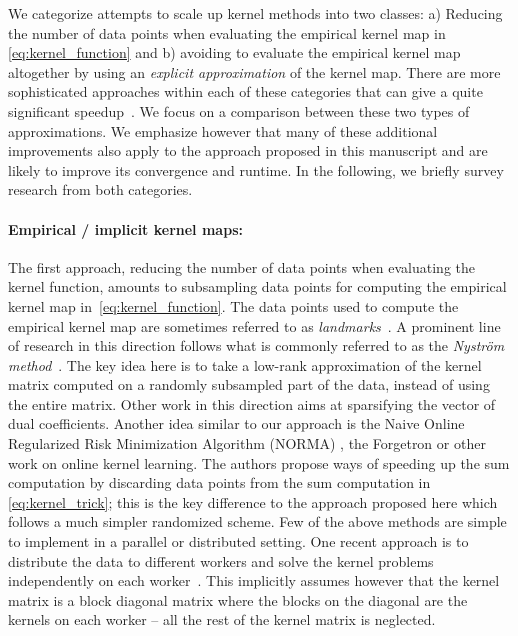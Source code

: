 \documentclass{article} %
\begin{document}
We categorize attempts to scale up kernel methods into two classes: a) Reducing the number of data points when evaluating the empirical kernel map in \autoref{eq:kernel_function} and b) avoiding to evaluate the empirical kernel map altogether by using an {\em explicit approximation} of the kernel map. There are more sophisticated approaches within each of these categories that can give a quite significant speedup~\cite{Le2013, Rudi2015}. We focus on a comparison between these two types of approximations. We emphasize however that many of these additional improvements also apply to the approach proposed in this manuscript and are likely to improve its convergence and runtime. In the following, we briefly survey research from both categories.

\paragraph{Empirical / implicit kernel maps:} The first approach, reducing the number of data points when evaluating the kernel function, amounts to subsampling data points for computing the empirical kernel map in~\autoref{eq:kernel_function}. 
The data points used to compute the empirical kernel map are sometimes referred to as {\em landmarks}~\cite{Hsieh2014}. 
A prominent line of research in this direction follows what is commonly referred to as the {\em Nystr\"om method}~\cite{Williams2000}. The key idea here is to take a low-rank approximation of the kernel matrix computed on a randomly subsampled part of the data, instead of using the entire matrix. 
Other work in this direction aims at sparsifying the vector of dual coefficients. Another idea similar to our approach is the Naive Online Regularized Risk Minimization Algorithm (NORMA) \cite{Kivinen2004}, the Forgetron \cite{Dekel2008} or other work on online kernel learning. The authors propose ways of speeding up the sum computation by discarding data points from the sum computation in \autoref{eq:kernel_trick}; this is the key difference to the approach proposed here which follows a much simpler randomized scheme.  
Few of the above methods are simple to implement in a parallel or distributed setting. One recent approach is to distribute the data to different workers and solve the kernel problems independently on each worker~\cite{Deisenroth2015}. This implicitly assumes however that the kernel matrix is a block diagonal matrix where the blocks on the diagonal are the kernels on each worker -- all the rest of the kernel matrix is neglected.
\end{document}
